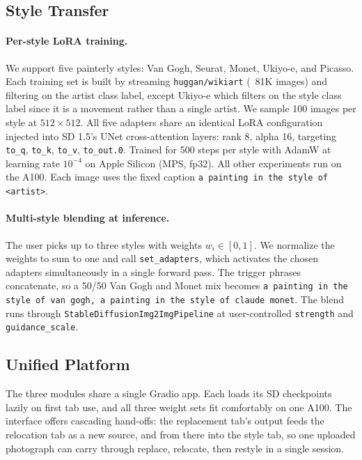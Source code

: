 \documentclass[10pt,twocolumn,letterpaper]{article}
\begin{document}
\subsection{Style Transfer}
\label{sec:style}

\paragraph{Per-style LoRA training.}
We support five painterly styles: Van Gogh, Seurat, Monet, Ukiyo-e, and Picasso. Each training set is built by streaming \texttt{huggan/wikiart} (~81K images) and filtering on the artist class label, except Ukiyo-e which filters on the style class label since it is a movement rather than a single artist. We sample 100 images per style at $512 \times 512$. All five adapters share an identical LoRA configuration injected into SD 1.5's UNet cross-attention layers: rank 8, alpha 16, targeting \texttt{to\_q}, \texttt{to\_k}, \texttt{to\_v}, \texttt{to\_out.0}. Trained for 500 steps per style with AdamW at learning rate $10^{-4}$ on Apple Silicon (MPS, fp32). All other experiments run on the A100. Each image uses the fixed caption \texttt{a painting in the style of <artist>}.

\paragraph{Multi-style blending at inference.}
The user picks up to three styles with weights $w_i \in [0, 1]$. We normalize the weights to sum to one and call \texttt{set\_adapters}, which activates the chosen adapters simultaneously in a single forward pass. The trigger phrases concatenate, so a 50/50 Van Gogh and Monet mix becomes \texttt{a painting in the style of van gogh, a painting in the style of claude monet}. The blend runs through \texttt{StableDiffusionImg2ImgPipeline} at user-controlled \texttt{strength} and \texttt{guidance\_scale}.

\subsection{Unified Platform}
\label{sec:platform}

The three modules share a single Gradio app. Each loads its SD checkpoints lazily on first tab use, and all three weight sets fit comfortably on one A100. The interface offers cascading hand-offs: the replacement tab's output feeds the relocation tab as a new source, and from there into the style tab, so one uploaded photograph can carry through replace, relocate, then restyle in a single session.
\end{document}
